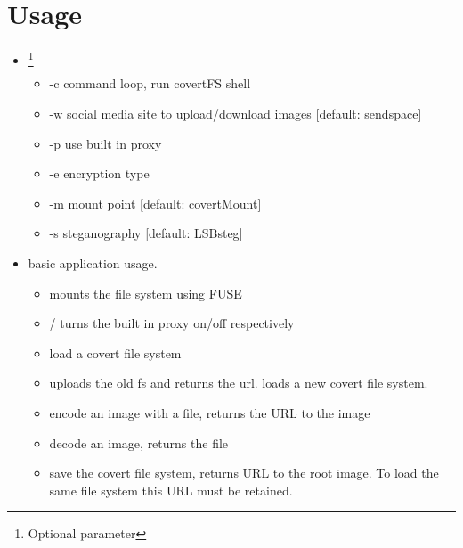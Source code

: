 \documentclass[letterpaper,12pt,openany,oneside]{sphinxmanual}
\begin{document}
\chapter{Usage}
\label{index:usage}\begin{itemize}
\item {} 
 \footnote[1]{
Optional parameter
}
\begin{itemize}
\item {} 
-c command loop, run covertFS shell

\item {} 
-w social media site to upload/download images {[}default: sendspace{]}

\item {} 
-p use built in proxy

\item {} 
-e encryption type

\item {} 
-m mount point {[}default: covertMount{]}

\item {} 
-s steganography {[}default: LSBsteg{]}

\end{itemize}

\item {} 
 basic application usage.
\begin{itemize}
\item {} 
 mounts the file system using FUSE

\item {} 
 /  turns the built in proxy on/off respectively

\item {} 
 load a covert file system

\item {} 
 uploads the old fs and returns the url. loads a new covert file system.

\item {} 
 encode an image with a file, returns the URL to the image

\item {} 
 decode an image, returns the file

\item {} 
 save the covert file system, returns URL to the root image. To load the same file system this URL must be retained.


\end{itemize}
\end{itemize}
\end{document}
